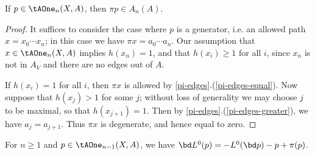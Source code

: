 \begin{lemma}\label{pi-allowed}
If $p \in \tAOne_{n}(X,A)$, then $\pi p \in A_n(A)$.
\end{lemma}

\begin{proof}
It suffices to consider the case where $p$ is a generator, i.e. an allowed path $x = x_0 \cdots x_n$; in this case we have $\pi x = a_0 \cdots a_n$. Our assumption that $x \in \tAOne_{n}(X,A)$ implies $h(x_n) = 1$, and that $h(x_i) \geq 1$ for all $i$, since $x_n$ is not in $A_V$ and there are no edges out of $A$. 

If $h(x_i) = 1$ for all $i$, then $\pi x$ is allowed by \cref{pi-edges}.(\ref{pi-edges-equal}). Now suppose that $h(x_j) > 1$ for some $j$; without loss of generality we may choose $j$ to be maximal, so that $h(x_{j+1}) = 1$. Then by \cref{pi-edges}.(\ref{pi-edges-greater}), we have $a_j = a_{j+1}$. Thus $\pi x$ is degenerate, and hence equal to zero.
\end{proof}

\begin{lemma}\label{L-bdry}
For $n \geq 1$ and $p \in \tAOne_{n-1}(X,A)$, we have $\bd L^0(p) = -L^0(\bd p) - p + \pi(p)$.
\end{lemma}

